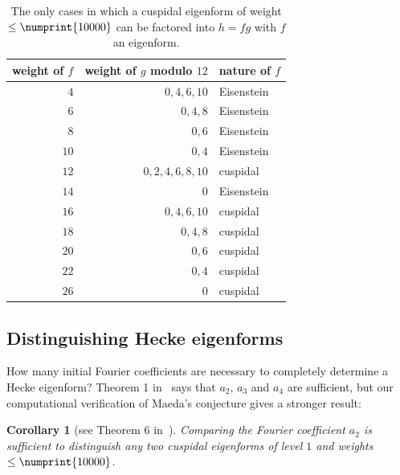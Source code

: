 \documentclass[11pt]{article}
\theoremstyle{plain}
\newtheorem{corollary}[theorem]{Corollary}
\theoremstyle{definition}
\theoremstyle{remark}
\numberwithin{equation}{section}
\newcommand{\bound}{\numprint{10000}}
\begin{document}
\begin{table}[h]
  \begin{center}
  \begin{tabular}{r|r|l}
    weight of $f$ & weight of $g$ modulo $12$ & nature of $f$ \\ \hline
    $4$ & $0,4,6,10$ & Eisenstein \\
    $6$ & $0,4,8$ & Eisenstein \\
    $8$ & $0,6$ & Eisenstein \\
    $10$ & $0,4$ & Eisenstein \\
    $12$ & $0,2,4,6,8,10$ & cuspidal\\
    $14$ & $0$ & Eisenstein \\
    $16$ & $0,4,6,10$ & cuspidal\\
    $18$ & $0,4,8$ & cuspidal\\
    $20$ & $0,6$ & cuspidal\\
    $22$ & $0,4$ & cuspidal\\
    $26$ & $0$ & cuspidal
  \end{tabular}
\end{center}
  \caption{The only cases in which a cuspidal eigenform of weight $\leq\bound$
  can be factored into $h=fg$ with $f$ an eigenform.}
  \label{tbl:div_eigen}
\end{table}

\subsection{Distinguishing Hecke eigenforms}

How many initial Fourier coefficients are necessary to completely determine a
Hecke eigenform?  Theorem 1 in~\cite{Ghitza} says that $a_2$, $a_3$ and $a_4$
are sufficient, but our computational verification of Maeda's conjecture gives
a stronger result:

\begin{corollary}[see Theorem 6 in~\cite{Ghitza}]
  Comparing the Fourier coefficient $a_2$ is sufficient to distinguish any two
  cuspidal eigenforms of level $1$ and weights $\leq\numprint{10000}$.
\end{corollary}



\printbibliography
\end{document}
